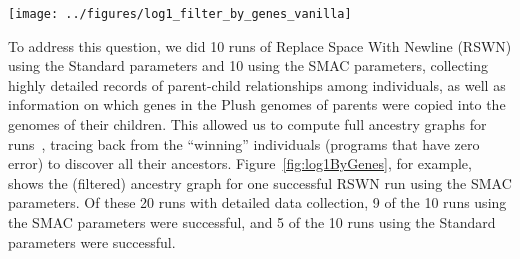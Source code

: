 \begin{figure*}
	\texttt{[image: ../figures/log1\_filter\_by\_genes\_vanilla]}
	\caption{Ancestry graph of a successful Replace Space With Newline run
	using the ``tuned'' parameters discovered by SMAC. This tree is filtered 
	to only include individuals that ultimately passed a gene
	on to the winning individual. Each individual is represented as a
	rectangle whose width is proportional to the number of selections
	it received, and whose color is a function of its error vector.
	Edges indicate parent-child relationships. Dashed black edges indicate
	that the child was constructed via alternation alone; solid black edges 
	indicate alternation followed by uniform mutation. Solid orange edges
	indicate applications of uniform mutation, and dashed orange represent
	applications of uniform close mutation.}
	\label{fig:log1ByGenes}
\end{figure*}

To address this question, we did 10 runs of Replace Space With Newline (RSWN) 
using the Standard parameters and 10 using the SMAC parameters, 
collecting highly detailed records of parent-child relationships 
among individuals, as well as information on which genes in the Plush 
genomes of parents were copied into
the genomes of their children. This allowed us to compute full ancestry
graphs for 
runs~\cite{McPhee:2016:VGP:2908961.2931741,McPhee:2015:GPTP,McPhee:2016:GPTP},
tracing back from the ``winning'' individuals (programs that have zero error)
to discover all their ancestors. Figure~\ref{fig:log1ByGenes}, for example,
shows the (filtered) ancestry graph for one successful RSWN run 
using the SMAC parameters. Of these 20 runs with detailed data collection,
9 of the 10 runs using the SMAC parameters were successful, and 5 of the
10 runs using the Standard parameters were successful.

